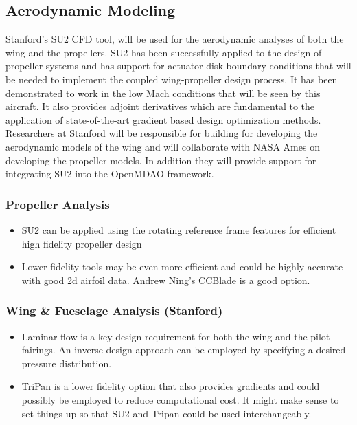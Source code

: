 \documentclass[]{aiaa-tc}
\begin{document}
    \subsection{Aerodynamic Modeling}

    Stanford's SU2 CFD tool, will be used for the aerodynamic analyses of both the wing and 
    the propellers. SU2 has been successfully applied to the design of propeller systems 
    and has support for actuator disk boundary conditions that will be needed to implement 
    the coupled wing­-propeller design process. It has been demonstrated to work in the low 
    Mach conditions that will be seen by this aircraft. It also provides adjoint derivatives 
    which are fundamental to the application of state­-of-­the-­art gradient based design 
    optimization methods. Researchers at Stanford will be responsible for building for developing 
    the aerodynamic models of the wing and will collaborate with NASA Ames on developing the 
    propeller models. In addition they will provide support for integrating SU2 into the OpenMDAO 
    framework. 

    \subsubsection{Propeller Analysis}
        \begin{itemize}
            \item SU2 can be applied using the rotating reference frame features for efficient high fidelity propeller design
            \item Lower fidelity tools may be even more efficient and could be highly accurate with good 2d airfoil data. Andrew Ning's 
            CCBlade is a good option. 
        \end{itemize}

    \subsubsection{Wing \& Fueselage Analysis (Stanford)}
        \begin{itemize}
            \item Laminar flow is a key design requirement for both the wing and the pilot fairings. An inverse design approach can be employed 
            by specifying a desired pressure distribution. 
            \item TriPan is a lower fidelity option that also provides gradients and could possibly be employed to reduce computational cost. It might make sense to set things up so that SU2 and Tripan could be used interchangeably. 
        \end{itemize}
\end{document}

